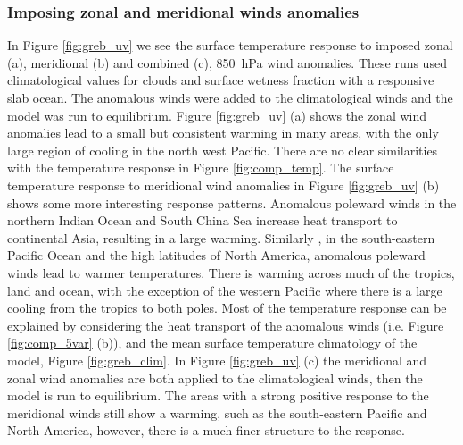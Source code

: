 \subsubsection{Imposing zonal and meridional winds anomalies}

In Figure \ref{fig:greb_uv} we see the surface temperature response to imposed 
zonal (a), meridional (b) and combined (c), \SI{850}{\hecto\pascal} wind 
anomalies. These runs used climatological values for clouds and surface wetness 
fraction with a responsive slab ocean. The anomalous winds were added to the 
climatological winds and the model was run to equilibrium.  Figure 
\ref{fig:greb_uv} (a) shows the zonal wind anomalies lead to a small but 
consistent warming in many areas, with the only large region of cooling in the 
north west Pacific. There are no clear similarities with the temperature 
response in Figure \ref{fig:comp_temp}.  The surface temperature response to 
meridional wind anomalies in Figure \ref{fig:greb_uv} (b) shows some more 
interesting response patterns. Anomalous poleward winds in the northern Indian 
Ocean and South China Sea increase heat transport to continental Asia, resulting 
in a large warming. Similarly , in the south-eastern Pacific Ocean and the high 
latitudes of North America, anomalous poleward winds lead to warmer 
temperatures. There is warming across much of the tropics, land and ocean, with 
the exception of the western Pacific where there is a large cooling from the 
tropics to both poles.  Most of the temperature response can be explained by 
considering the heat transport of the anomalous winds (i.e. Figure 
\ref{fig:comp_5var} (b)), and the mean surface temperature climatology of the 
model, Figure \ref{fig:greb_clim}.  In Figure \ref{fig:greb_uv} (c) the 
meridional and zonal wind anomalies are both applied to the climatological 
winds, then the model is run to equilibrium. The areas with a strong positive 
response to the meridional winds still show a warming, such as the south-eastern 
Pacific and North America, however, there is a much finer structure to the 
response.

